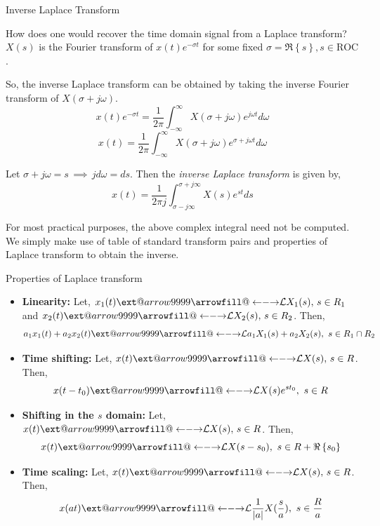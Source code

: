 \documentclass{beamer}
\makeatletter
\newcommand\xleftrightarrow[2][]{%
  \ext@arrow 9999{\longleftrightarrowfill@}{#1}{#2}}
\newcommand\longleftrightarrowfill@{%
  \arrowfill@\leftarrow\relbar\rightarrow}
\makeatother
\begin{document}
\begin{frame}{Inverse Laplace Transform}

How does one would recover the time domain signal from a Laplace transform? $X(s)$ is the Fourier transform of $x(t)e^{-\sigma t}$ for some fixed $\sigma = \Re \left\lbrace s \right\rbrace, s \in \text{ROC}$. 

So, the inverse Laplace transform can be obtained by taking the inverse Fourier transform of $X(\sigma + j\omega)$.
\vspace{-2mm}
\[ x(t)e^{-\sigma t} = \frac{1}{2\pi} \int_{-\infty}^{\infty}X(\sigma + j\omega)e^{j\omega t} d\omega \]
\vspace{-2mm}
\[ x(t) = \frac{1}{2\pi} \int_{-\infty}^{\infty}X(\sigma + j\omega)e^{\sigma + j\omega t} d\omega \]

Let $\sigma + j\omega = s \, \implies \, jd\omega = ds$. Then the \textit{inverse Laplace transform} is given by,
\vspace{-4mm}
\[ x(t) = \frac{1}{2\pi j} \int_{\sigma - j\infty}^{\sigma + j\infty}X(s)e^{st}ds \]

For most practical purposes, the above complex integral need not be computed. We simply make use of table of standard transform pairs and properties of Laplace transform to obtain the inverse. 
\end{frame}

\begin{frame}{Properties of Laplace transform}

\begin{itemize}
\item \textbf{Linearity:} Let, $x_1(t) \xleftrightarrow{\mathcal{L}} X_1(s), \, s \in R_1$ and $x_2(t) \xleftrightarrow{\mathcal{L}} X_2(s), \, s \in R_2$. Then,
\vspace{-3mm}
\[ a_1x_1(t) + a_2x_2(t) \xleftrightarrow{\mathcal{L}} a_1X_1(s) + a_2X_2(s), \,\, s \in R_1 \cap R_2 \]

\item \textbf{Time shifting:} Let, $x(t) \xleftrightarrow{\mathcal{L}} X(s), \, s \in R$. Then,
\vspace{-3mm}
\[ x(t-t_0) \xleftrightarrow{\mathcal{L}} X(s)e^{st_0}, \,\, s \in R \]

\item \textbf{Shifting in the $s$ domain:} Let, $x(t) \xleftrightarrow{\mathcal{L}} X(s), \, s \in R$. Then,
\vspace{-3mm}
\[ x(t) \xleftrightarrow{\mathcal{L}} X(s-s_0), \,\, s \in R + \Re \left\lbrace s_0 \right\rbrace \]

\item \textbf{Time scaling:} Let, $x(t) \xleftrightarrow{\mathcal{L}} X(s), \, s \in R$. Then,
\vspace{-3mm}
\[ x(at) \xleftrightarrow{\mathcal{L}} \frac{1}{\left|a\right|}X(\frac{s}{a}), \,\, s \in \frac{R}{a} \]
\end{itemize}

\end{frame}
\end{document}
